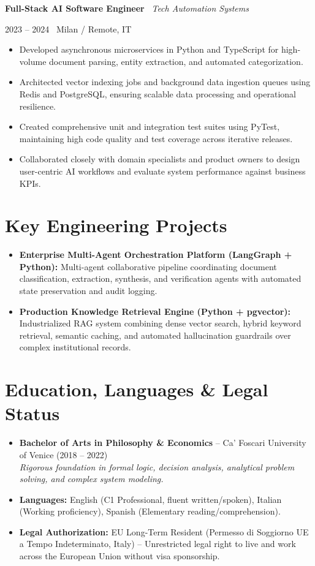 \documentclass[a4paper,10pt]{article}
\newcommand{\role}[4]{%
  \vspace{2pt}\noindent
  \begin{minipage}[t]{0.70\textwidth}\raggedright\textbf{#1} \textbullet\ \textit{#3}\end{minipage}%
  \hfill
  \begin{minipage}[t]{0.28\textwidth}\raggedleft\footnotesize\color{gray}#2 \textbullet\ #4\end{minipage}%
  \vspace{1pt}%
}
\begin{document}
\vspace{3pt}
\role{Full-Stack AI Software Engineer}{2023 -- 2024}{Tech Automation Systems}{Milan / Remote, IT}
\begin{itemize}
  \item Developed asynchronous microservices in Python and TypeScript for high-volume document parsing, entity extraction, and automated categorization.
  \item Architected vector indexing jobs and background data ingestion queues using Redis and PostgreSQL, ensuring scalable data processing and operational resilience.
  \item Created comprehensive unit and integration test suites using PyTest, maintaining high code quality and test coverage across iterative releases.
  \item Collaborated closely with domain specialists and product owners to design user-centric AI workflows and evaluate system performance against business KPIs.
\end{itemize}

\section{Key Engineering Projects}
\begin{itemize}
  \item \textbf{Enterprise Multi-Agent Orchestration Platform (LangGraph + Python):} Multi-agent collaborative pipeline coordinating document classification, extraction, synthesis, and verification agents with automated state preservation and audit logging.
  \item \textbf{Production Knowledge Retrieval Engine (Python + pgvector):} Industrialized RAG system combining dense vector search, hybrid keyword retrieval, semantic caching, and automated hallucination guardrails over complex institutional records.
\end{itemize}

\section{Education, Languages \& Legal Status}
\begin{itemize}
  \item \textbf{Bachelor of Arts in Philosophy \& Economics} -- Ca' Foscari University of Venice (2018 -- 2022) \\
  \textit{Rigorous foundation in formal logic, decision analysis, analytical problem solving, and complex system modeling.}
  \item \textbf{Languages:} English (C1 Professional, fluent written/spoken), Italian (Working proficiency), Spanish (Elementary reading/comprehension).
  \item \textbf{Legal Authorization:} EU Long-Term Resident (Permesso di Soggiorno UE a Tempo Indeterminato, Italy) -- Unrestricted legal right to live and work across the European Union without visa sponsorship.
\end{itemize}
\end{document}
